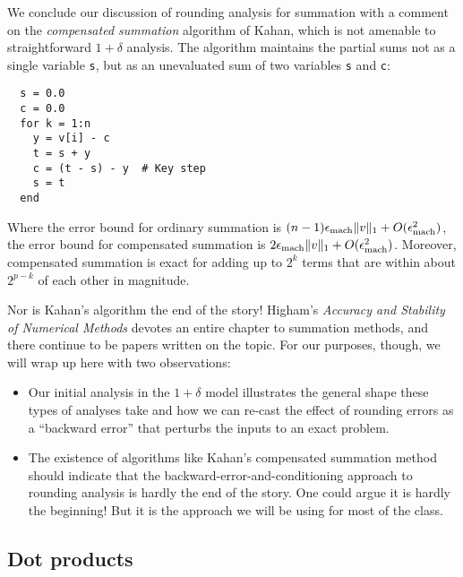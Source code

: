 \documentclass[12pt, leqno]{article} %
\begin{document}
We conclude our discussion of rounding analysis for summation
with a comment on the {\em compensated summation} algorithm of
Kahan, which is not amenable to straightforward $1+\delta$ analysis.
The algorithm maintains the partial sums not as a single variable
{\tt s}, but as an unevaluated sum of two
variables {\tt s} and {\tt c}:
\begin{lstlisting}
  s = 0.0
  c = 0.0
  for k = 1:n
    y = v[i] - c
    t = s + y
    c = (t - s) - y  # Key step
    s = t
  end
\end{lstlisting}
Where the error bound for ordinary summation is
$(n-1) \epsilon_{\mathrm{mach}} \|v\|_1 + O(\epsilon_{\mathrm{mach}}^2)$,
the error bound for compensated summation is
$2 \epsilon_{\mathrm{mach}} \|v\|_1 + O(\epsilon_{\mathrm{mach}}^2)$.  Moreover,
compensated summation is exact for adding up to $2^k$
terms that are within about $2^{p-k}$ of each other
in magnitude.

Nor is Kahan's algorithm the end of the story!
Higham's {\em Accuracy and Stability of Numerical Methods}
devotes an entire chapter to summation methods, and there
continue to be papers written on the topic.  For our purposes,
though, we will wrap up here with two observations:
\begin{itemize}
\item Our initial analysis in the $1+\delta$ model illustrates the
  general shape these types of analyses take and how we can re-cast
  the effect of rounding errors as a ``backward error'' that perturbs
  the inputs to an exact problem.
\item The existence of algorithms like Kahan's compensated summation
  method should indicate that the backward-error-and-conditioning
  approach to rounding analysis is hardly the end of the story.
  One could argue it is hardly the beginning!  But it is the approach
  we will be using for most of the class.
\end{itemize}

\subsection{Dot products}
\end{document}
